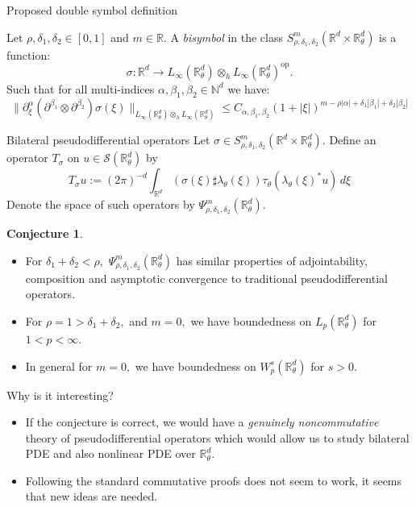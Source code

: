 \documentclass{beamer}
\numberwithin{equation}{section}
\theoremstyle{plain}
\theoremstyle{plain}
\theoremstyle{definition}
\theoremstyle{plain}
\theoremstyle{plain}
\theoremstyle{definition}
\newtheorem{conjecture}{Conjecture}
\newcommand{\Rl}{\mathbb{R}}
\newcommand{\Ntrl}{\mathbb{N}}
\newcommand{\Sc}{\mathcal{S}}
\newcommand{\dmult}{\sharp}
\newcommand{\op}{\mathrm{op}}
\begin{document}
\begin{frame}{Proposed double symbol definition}
\begin{definition}
    Let $\rho,\delta_1,\delta_2 \in [0,1]$ and $m \in \Rl$. A \emph{bisymbol} in the class $S^m_{\rho,\delta_1,\delta_2}(\Rl^d\times \Rl^d_\theta)$
    is a function:
    \begin{equation*}
        \sigma:\Rl^d\to L_\infty(\Rl^d_\theta)\otimes_h L_\infty(\Rl^d_\theta)^\op.
    \end{equation*}
    Such that for all multi-indices $\alpha,\beta_1,\beta_2\in \Ntrl^d$ we have:
    \begin{equation*}
        \|\partial_\xi^\alpha (\partial^{\beta_1}\otimes \partial^{\beta_2})\sigma(\xi)\|_{L_\infty(\Rl^d_\theta)\otimes_h L_\infty(\Rl^d_\theta)} \leq C_{\alpha,\beta_1,\beta_2}(1+|\xi|)^{m-\rho|\alpha|+\delta_1|\beta_1|+\delta_2|\beta_2|}
    \end{equation*}
\end{definition}
\end{frame}

\begin{frame}{Bilateral pseudodifferential operators}
Let $\sigma\in S^m_{\rho,\delta_1,\delta_2}(\Rl^d\times \Rl^d_\theta).$ Define an operator $T_{\sigma}$ on $u\in \Sc(\Rl^d_\theta)$ by
\begin{equation*}
    T_\sigma u := (2\pi)^{-d}\int_{\Rl^d} (\sigma(\xi)\dmult \lambda_\theta(\xi))\tau_\theta(\lambda_\theta(\xi)^*u)\,d\xi
\end{equation*}
Denote the space of such operators by $\Psi^{m}_{\rho,\delta_1,\delta_2}(\Rl^d_\theta).$
\pause
\begin{conjecture}
\begin{itemize}
    \item{} For $\delta_1+\delta_2<\rho,$ $\Psi^m_{\rho,\delta_1,\delta_2}(\Rl^d_\theta)$ has similar properties of adjointability, composition and asymptotic convergence to traditional pseudodifferential operators. \pause
    \item{} For $\rho=1>\delta_1+\delta_2,$ and $m=0,$ we have boundedness on $L_p(\Rl^d_\theta)$ for $1<p<\infty.$\pause
    \item{} In general for $m=0,$ we have boundedness on $W^s_p(\Rl^d_\theta)$ for $s>0.$
\end{itemize}
\end{conjecture}
\end{frame}

\begin{frame}{Why is it interesting?}
\begin{itemize}
    \item{} If the conjecture is correct, we would have a \emph{genuinely noncommutative} theory of pseudodifferential operators which would allow us to study bilateral PDE and also nonlinear PDE
    over $\Rl^d_\theta.$\pause
    \item{} Following the standard commutative proofs does not seem to work, it seems that new ideas are needed.
\end{itemize}
\end{frame}
\end{document}
